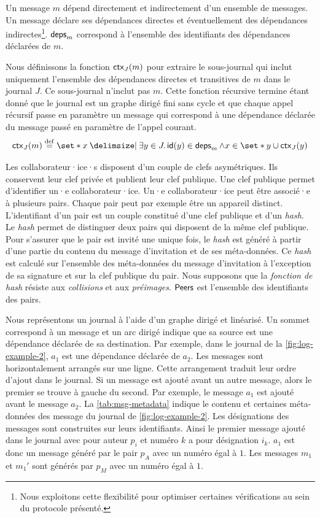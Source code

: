 Un message $m$ dépend directement et indirectement d'un ensemble de messages.
Un message déclare ses dépendances directes et éventuellement des dépendances indirectes\footnote{Nous exploitons cette flexibilité pour optimiser certaines vérifications au sein du protocole présenté.}.
$\operatorname{\mathsf{deps}}_m$ correspond à l'ensemble des identifiants des dépendances déclarées de $m$.

Nous définissons la fonction $\operatorname{\mathsf{ctx}}_J(m)$ pour extraire le sous-journal qui inclut uniquement l'ensemble des dépendances directes et transitives de $m$ dans le journal $J$.
Ce sous-journal n'inclut pas $m$.
Cette fonction récursive termine étant donné que le journal est un graphe dirigé fini sans cycle et que chaque appel récursif passe en paramètre un message qui correspond à une dépendance déclarée du message passé en paramètre de l'appel courant.
%
\begin{equation*}
    \trm{ctx}_J(m) \defeq \set*{ x \given \exists y \in J \qsep \trm{id}(y) \in \trm{deps}_m \land x \in \set*{y} \cup \trm{ctx}_J(y)}
\end{equation*}

Les collaborateur·ice·s disposent d'un couple de clefs asymétriques.
Ils conservent leur clef privée et publient leur clef publique.
Une clef publique permet d'identifier un·e collaborateur·ice.
Un·e collaborateur·ice peut être associé·e à plusieurs pairs.
Chaque pair peut par exemple être un appareil distinct.
L'identifiant d'un pair est un couple constitué d'une clef publique et d'un \emph{hash}.
Le \emph{hash} permet de distinguer deux pairs qui disposent de la même clef publique.
Pour s'assurer que le pair est invité une unique fois, le \emph{hash} est généré à partir d'une partie du contenu du message d'invitation et de ses méta-données.
Ce \emph{hash} est calculé sur l'ensemble des méta-données du message d'invitation à l'exception de sa signature et sur la clef publique du pair.
Nous supposons que la \emph{fonction de hash} résiste aux \emph{collisions} et aux \emph{préimages}.
$\operatorname{\mathsf{Peers}}$ est l'ensemble des identifiants des pairs.

Nous représentons un journal à l'aide d'un graphe dirigé et linéarisé.
Un sommet correspond à un message et un arc dirigé indique que sa source est une dépendance déclarée de sa destination.
Par exemple, dans le journal de la \autoref{fig:log-example-2}, $a_1$ est une dépendance déclarée de $a_2$.
Les messages sont horizontalement arrangés sur une ligne.
Cette arrangement traduit leur ordre d'ajout dans le journal.
Si un message est ajouté avant un autre message, alors le premier se trouve à gauche du second.
Par exemple, le message $a_1$ est ajouté avant le message $a_2$.
La \autoref{tab:msg-metadata} indique le contenu et certaines méta-données des message du journal de \autoref{fig:log-example-2}.
Les désignations des messages sont construites sur leurs identifiants.
Ainsi le premier message ajouté dans le journal avec pour auteur $p_i$ et numéro $k$ a pour désignation $i_k$.
$a_1$ est donc un message généré par le pair $p_A$ avec un numéro égal à $1$.
Les messages $m_1$ et $m_1'$ sont générés par $p_M$ avec un numéro égal à $1$.


